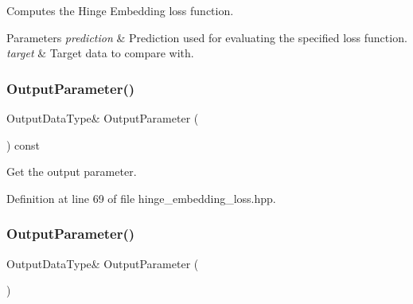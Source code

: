 Computes the Hinge Embedding loss function. 


\begin{DoxyParams}{Parameters}
{\em prediction} & Prediction used for evaluating the specified loss function. \\
\hline
{\em target} & Target data to compare with. \\
\hline
\end{DoxyParams}
\mbox{\label{classmlpack_1_1ann_1_1HingeEmbeddingLoss_a8bae962cc603d1cab8d80ec78f8d505d}} 
\subsubsection{Output\+Parameter()\hspace{0.1cm}{\footnotesize\ttfamily [1/2]}}
{\footnotesize\ttfamily Output\+Data\+Type\& Output\+Parameter (\begin{DoxyParamCaption}{ }\end{DoxyParamCaption}) const\hspace{0.3cm}{\ttfamily [inline]}}



Get the output parameter. 



Definition at line 69 of file hinge\+\_\+embedding\+\_\+loss.\+hpp.

\mbox{\label{classmlpack_1_1ann_1_1HingeEmbeddingLoss_a21d5f745f02c709625a4ee0907f004a5}} 
\subsubsection{Output\+Parameter()\hspace{0.1cm}{\footnotesize\ttfamily [2/2]}}
{\footnotesize\ttfamily Output\+Data\+Type\& Output\+Parameter (\begin{DoxyParamCaption}{ }\end{DoxyParamCaption})\hspace{0.3cm}{\ttfamily [inline]}}



